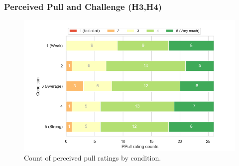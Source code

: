  \clearpage   
\subsubsection{Perceived Pull and Challenge (H3,H4)}
\label{subsubsection:ppullChallenge}
  
\begin{figure}[H]
\centering
\captionsetup{justification=centering,margin=0.1cm}
\hspace{-20mm}
\includegraphics[scale=0.7]{Files/Plots/ppull_by_condition_count_stacked.png}
\caption{Count of perceived pull ratings by condition.}
\label{fig:ppullStacked}
\end{figure}
\vspace{-5mm}

